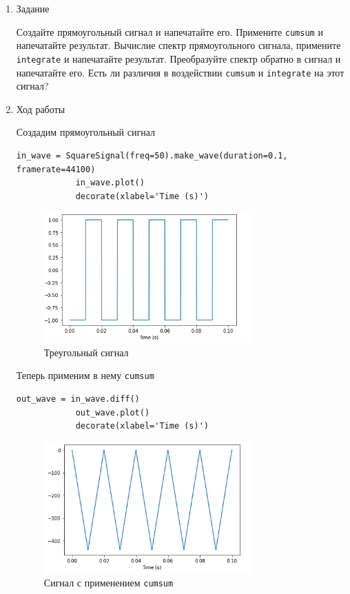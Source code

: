 \documentclass[a4paper,12pt]{article}
\begin{document}
	\begin{enumerate}
		
		\item{Задание}
		
		Создайте прямоугольный сигнал и напечатайте его. Примените \texttt{cumsum} и напечатайте результат. Вычислие спектр прямоугольного сигнала, примените \texttt{integrate} и напечатайте результат. Преобразуйте спектр обратно в сигнал и напечатайте его. Есть ли различия в воздействии \texttt{cumsum} и \texttt{integrate} на этот сигнал?
		
		\item{Ход работы}
		
		Создадим прямоугольный сигнал
		\begin{lstlisting}[caption=Создаем прямоугольный сигнал]
			in_wave = SquareSignal(freq=50).make_wave(duration=0.1, framerate=44100)
			in_wave.plot()
			decorate(xlabel='Time (s)')
		\end{lstlisting}
		\begin{figure}[H]
			\centering
			\includegraphics[width=0.75\textwidth]{3_1.png}
			\caption{Треугольный сигнал}
			\label{fig:3.1}
		\end{figure}
		
		Теперь применим в нему \texttt{cumsum}
		\begin{lstlisting}[caption=Применяем \texttt{cumsum}]
			out_wave = in_wave.diff()
			out_wave.plot()
			decorate(xlabel='Time (s)')
		\end{lstlisting}
		\begin{figure}[H]
			\centering
			\includegraphics[width=0.75\textwidth]{3_2.png}
			\caption{Сигнал с применением \texttt{cumsum}}
			\label{fig:3.2}
		\end{figure}
		

\end{enumerate}
\end{document}
